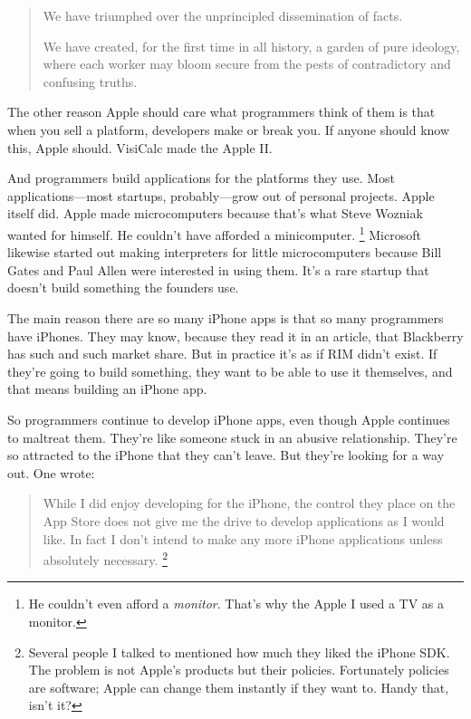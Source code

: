 \begin{quote}
We have triumphed over the unprincipled dissemination of facts.

We have created, for the first time in all history, a garden of pure
ideology, where each worker may bloom secure from the pests of
contradictory and confusing truths.
\end{quote}

The other reason Apple should care what programmers think of them is
that when you sell a platform, developers make or break you. If anyone
should know this, Apple should. VisiCalc made the Apple II.

And programmers build applications for the platforms they use. Most
applications---most startups, probably---grow out of personal projects.
Apple itself did. Apple made microcomputers because that's what Steve
Wozniak wanted for himself. He couldn't have afforded a minicomputer.
\footnote{He couldn't even afford a \emph{monitor}. That's why the Apple I
used a TV as a monitor.} Microsoft likewise started out making
interpreters for little microcomputers because Bill Gates and Paul Allen
were interested in using them. It's a rare startup that doesn't build
something the founders use.

The main reason there are so many iPhone apps is that so many
programmers have iPhones. They may know, because they read it in an
article, that Blackberry has such and such market share. But in practice
it's as if RIM didn't exist. If they're going to build something, they
want to be able to use it themselves, and that means building an iPhone
app.

So programmers continue to develop iPhone apps, even though Apple
continues to maltreat them. They're like someone stuck in an abusive
relationship. They're so attracted to the iPhone that they can't leave.
But they're looking for a way out. One wrote:

\begin{quote}
While I did enjoy developing for the iPhone, the control they place on
the App Store does not give me the drive to develop applications as I
would like. In fact I don't intend to make any more iPhone applications
unless absolutely necessary. \footnote{Several people I talked to mentioned how much they liked the
iPhone SDK. The problem is not Apple's products but their policies.
Fortunately policies are software; Apple can change them instantly if
they want to. Handy that, isn't it?}
\end{quote}

